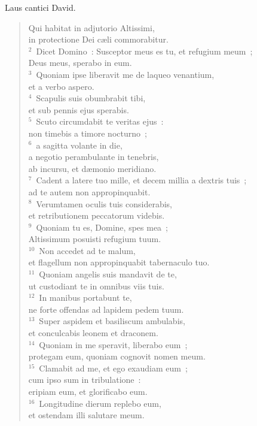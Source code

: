 \lettrine[lines=3,image=true,loversize=0.05,lraise=-0.03]{L}{}aus cantici David. \begin{flushleft}\begin{verse}\vspace{6pt}Qui habitat in adjutorio Altissimi,\\ in protectione Dei c\ae li commorabitur.\\
${}^{2}$~Dicet Domino~: Susceptor meus es tu, et refugium meum~;\\ Deus meus, sperabo in eum.\\
${}^{3}$~Quoniam ipse liberavit me de laqueo venantium,\\ et a verbo aspero.\\
${}^{4}$~Scapulis suis obumbrabit tibi,\\ et sub pennis ejus sperabis.\\
${}^{5}$~Scuto circumdabit te veritas ejus~:\\ non timebis a timore nocturno~;\\
${}^{6}$~a sagitta volante in die,\\ a negotio perambulante in tenebris,\\ ab incursu, et d\ae monio meridiano.\\
${}^{7}$~Cadent a latere tuo mille, et decem millia a dextris tuis~;\\ ad te autem non appropinquabit.\\
${}^{8}$~Verumtamen oculis tuis considerabis,\\ et retributionem peccatorum videbis.\\
${}^{9}$~Quoniam tu es, Domine, spes mea~;\\ Altissimum posuisti refugium tuum.\\
${}^{10}$~Non accedet ad te malum,\\ et flagellum non appropinquabit tabernaculo tuo.\\
${}^{11}$~Quoniam angelis suis mandavit de te,\\ ut custodiant te in omnibus viis tuis.\\
${}^{12}$~In manibus portabunt te,\\ ne forte offendas ad lapidem pedem tuum.\\
${}^{13}$~Super aspidem et basiliscum ambulabis,\\ et conculcabis leonem et draconem.\\
${}^{14}$~Quoniam in me speravit, liberabo eum~;\\ protegam eum, quoniam cognovit nomen meum.\\
${}^{15}$~Clamabit ad me, et ego exaudiam eum~;\\ cum ipso sum in tribulatione~:\\ eripiam eum, et glorificabo eum.\\
${}^{16}$~Longitudine dierum replebo eum,\\ et ostendam illi salutare meum.\end{verse}\end{flushleft}



